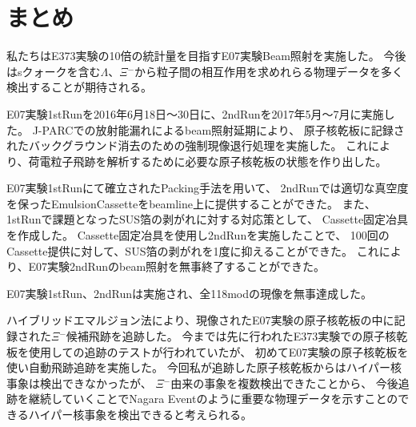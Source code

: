 \documentclass[12pt,a4paper]{jarticle}
\begin{document}
\newpage
\section{まとめ}
私たちはE373実験の10倍の統計量を目指すE07実験Beam照射を実施した。
今後はsクォークを含む$\Lambda$、$\Xi$$^-$から粒子間の相互作用を求めれらる物理データを多く検出することが期待される。
\par
E07実験1stRunを2016年6月18日〜30日に、2ndRunを2017年5月～7月に実施した。
J-PARCでの放射能漏れによるbeam照射延期により、
原子核乾板に記録されたバックグラウンド消去のための強制現像退行処理を実施した。
これにより、荷電粒子飛跡を解析するために必要な原子核乾板の状態を作り出した。
\par
E07実験1stRunにて確立されたPacking手法を用いて、
2ndRunでは適切な真空度を保ったEmulsionCassetteをbeamline上に提供することができた。
また、1stRunで課題となったSUS箔の剥がれに対する対応策として、
Cassette固定冶具を作成した。
Cassette固定冶具を使用し2ndRunを実施したことで、
100回のCassette提供に対して、SUS箔の剥がれを1度に抑えることができた。
これにより、E07実験2ndRunのbeam照射を無事終了することができた。
\par
E07実験1stRun、2ndRunは実施され、全118modの現像を無事達成した。
\par
ハイブリッドエマルジョン法により、現像されたE07実験の原子核乾板の中に記録された$\Xi$$^-$候補飛跡を追跡した。
今までは先に行われたE373実験での原子核乾板を使用しての追跡のテストが行われていたが、
初めてE07実験の原子核乾板を使い自動飛跡追跡を実施した。
今回私が追跡した原子核乾板からはハイパー核事象は検出できなかったが、
$\Xi$$^-$由来の事象を複数検出できたことから、
今後追跡を継続していくことでNagara Eventのように重要な物理データを示すことのできるハイパー核事象を検出できると考えられる。

\newpage
\end{document}

